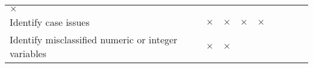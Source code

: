 \documentclass[
]{report}
\begin{document}
\begin{longtable}[]{@{}lcccccccc@{}}
\begin{minipage}[t]{0.09\columnwidth}
\(\times\)\strut
\end{minipage} & \begin{minipage}[t]{0.06\columnwidth}\centering
\strut
\end{minipage} & \begin{minipage}[t]{0.06\columnwidth}\centering
\strut
\end{minipage} & \begin{minipage}[t]{0.05\columnwidth}\centering
\strut
\end{minipage} & \begin{minipage}[t]{0.06\columnwidth}\centering
\strut
\end{minipage}\tabularnewline
\begin{minipage}[t]{0.28\columnwidth}\raggedright
Identify case issues\strut
\end{minipage} & \begin{minipage}[t]{0.06\columnwidth}\centering
\(\times\)\strut
\end{minipage} & \begin{minipage}[t]{0.06\columnwidth}\centering
\(\times\)\strut
\end{minipage} & \begin{minipage}[t]{0.06\columnwidth}\centering
\(\times\)\strut
\end{minipage} & \begin{minipage}[t]{0.09\columnwidth}\centering
\(\times\)\strut
\end{minipage} & \begin{minipage}[t]{0.06\columnwidth}\centering
\strut
\end{minipage} & \begin{minipage}[t]{0.06\columnwidth}\centering
\strut
\end{minipage} & \begin{minipage}[t]{0.05\columnwidth}\centering
\strut
\end{minipage} & \begin{minipage}[t]{0.06\columnwidth}\centering
\strut
\end{minipage}\tabularnewline
\begin{minipage}[t]{0.28\columnwidth}\raggedright
Identify misclassified numeric or integer variables\strut
\end{minipage} & \begin{minipage}[t]{0.06\columnwidth}\centering
\(\times\)\strut
\end{minipage} & \begin{minipage}[t]{0.06\columnwidth}\centering
\(\times\)\strut

\end{minipage}
\end{longtable}
\end{document}
